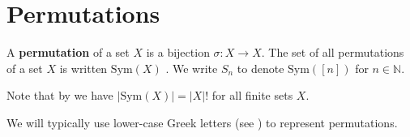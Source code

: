 \section{Permutations}

\todo{}

\begin{definition}
\label{defPermutation}
A \textbf{permutation} of a set $X$ is a bijection $\sigma : X \to X$. The set of all permutations of a set $X$ is written $\mathrm{Sym}(X)$ . We write $S_n$ to denote $\mathrm{Sym}([n])$ for $n \in \mathbb{N}$.
\end{definition}

Note that by  we have $|\mathrm{Sym}(X)| = |X|!$ for all finite sets $X$.

We will typically use lower-case Greek letters (see ) to represent permutations.

